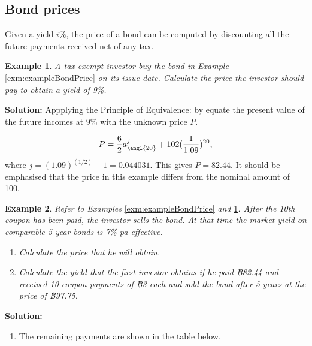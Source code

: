 \documentclass[
]{book}
\providecommand{\tightlist}{%
  \setlength{\itemsep}{0pt}\setlength{\parskip}{0pt}}
\theoremstyle{definition}
\theoremstyle{definition}
\newtheorem{example}{Example}[chapter]
\theoremstyle{definition}
\theoremstyle{definition}
\theoremstyle{remark}
\begin{document}
\hypertarget{bond-prices}{%
\subsection{Bond prices}\label{bond-prices}}

Given a yield \(i\%\), the price of a bond can be computed by discounting
all the future payments received net of any tax.

\begin{example}
\protect\hypertarget{exm:exampleBondPrice2}{}\label{exm:exampleBondPrice2}\emph{A tax-exempt investor buy the bond in Example}
\ref{exm:exampleBondPrice} \emph{on its issue date. Calculate the price the
investor should pay to obtain a yield of 9\%.}
\end{example}

\textbf{Solution:} Appplying the Principle of Equivalence: by equate the
present value of the future incomes at 9\% with the unknown price \(P\).

\[P = \frac{6}{2} a^j_{\angl{20}} + 102 (\frac{1}{1.09})^{20},\] where
\(j = (1.09)^{(1/2)} - 1 = 0.044031.\) This gives \(P = 82.44\). It should
be emphasised that the price in this example differs from the nominal
amount of 100.

\begin{example}

\emph{Refer to Examples} \ref{exm:exampleBondPrice} \emph{and}
\ref{exm:exampleBondPrice2}\emph{. After the 10th coupon has been paid, the
investor sells the bond. At that time the market yield on comparable
5-year bonds is 7\% pa effective.}

\begin{enumerate}
\def\labelenumi{\arabic{enumi}.}
\item
  \emph{Calculate the price that he will obtain.}
\item
  \emph{Calculate the yield that the first investor obtains if he paid
  ฿82.44 and received 10 coupon payments of ฿3 each and sold the bond
  after 5 years at the price of ฿97.75.}
\end{enumerate}

\end{example}

\textbf{Solution:}

\begin{enumerate}
\def\labelenumi{\arabic{enumi}.}
\tightlist
\item
  The remaining payments are shown in the table below.
\end{enumerate}
\end{document}
